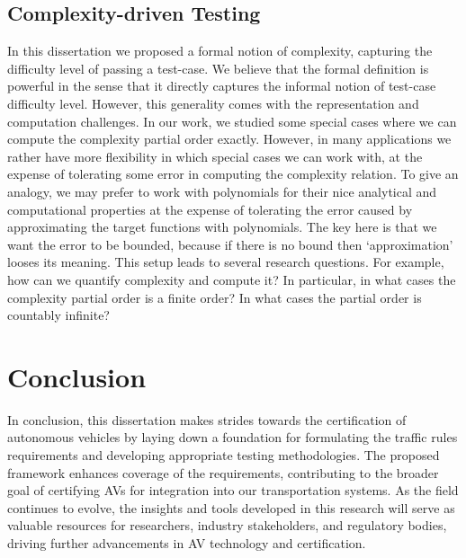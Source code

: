 \subsection{Complexity-driven Testing}
In this dissertation we proposed a formal notion of complexity, capturing the difficulty level of passing a test-case.
%
We believe that the formal definition is powerful in the sense that it directly captures the informal notion of test-case difficulty level.
%
However, this generality comes with the representation and computation challenges.
%
In our work, we studied some special cases where we can compute the complexity partial order exactly.
% 
However, in many applications we rather have more flexibility in which special cases we can work with, at the expense of tolerating some error in computing the complexity relation.
%
To give an analogy, we may prefer to work with polynomials for their nice analytical and computational properties at the expense of tolerating the error caused by approximating the target functions with polynomials.
%
The key here is that we want the error to be bounded, because if there is no bound then `approximation' looses its meaning.
%
This setup leads to several research questions.
%
For example, how can we quantify complexity and compute it?
%
In particular, in what cases the complexity partial order is a finite order?
%
In what cases the partial order is countably infinite?



\section{Conclusion}

In conclusion, this dissertation makes  strides towards the certification of autonomous vehicles by laying down a foundation for formulating the traffic rules requirements and developing appropriate testing methodologies.
%
The proposed framework enhances coverage of the requirements, contributing to the broader goal of certifying AVs for integration into our transportation systems.
%
As the field continues to evolve, the insights and tools developed in this research will serve as valuable resources for researchers, industry stakeholders, and regulatory bodies, driving further advancements in AV technology and certification.